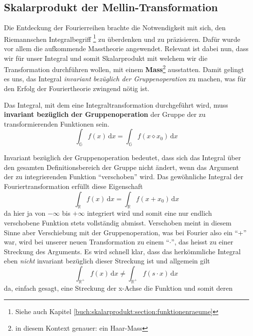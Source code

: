 \subsection{Skalarprodukt der Mellin-Transformation
\label{mellin:subsection:skalarprodukt}}
Die Entdeckung der Fourierreihen brachte die Notwendigkeit mit sich, den 
Riemannschen Integralbegriff \footnote{Siehe auch Kapitel 
\ref{buch:skalarprodukt:section:funktionenraeume}} zu überdenken und zu 
präzisieren.
Dafür wurde vor allem die aufkommende Masstheorie angewendet.
Relevant ist dabei nun, dass wir für unser Integral und somit Skalarprodukt 
mit welchem wir die Transformation durchführen wollen, 
mit einem \textbf{Mass}\footnote{in diesem Kontext genauer: ein Haar-Mass} 
ausstatten. 
Damit gelingt es uns, das Integral 
\emph{invariant bezüglich der Gruppenoperation} zu machen, was für den 
Erfolg der Fouriertheorie zwingend nötig ist. 
\begin{satz}
    \label{buch:papers:mellin:teil2:satz:int}
    Das Integral, mit dem eine Integraltransformation durchgeführt wird, 
    muss \textbf{invariant bezüglich der Gruppenoperation} der Gruppe 
    der zu transformierenden Funktionen sein.
    \[
        \int_\mathbb{G} f(x)\,\mathrm{d}x 
        = \int_\mathbb{G} f(x \diamond x_0)\,\mathrm{d}x
    \]
\end{satz}
Invariant bezüglich der Gruppenoperation bedeutet, dass sich das Integral 
über den gesamten Definitionsbereich der Gruppe nicht ändert, wenn das 
Argument der zu integrierenden Funktion ``verschoben'' wird. 
Das gewöhnliche Integral der Fouriertransformation erfüllt diese 
Eigenschaft 
\begin{equation}
    \int_\mathbb{R} f(x)\,\mathrm{d}x 
    = \int_\mathbb{R} f(x + x_0)\,\mathrm{d}x
\end{equation}
da hier ja von $-\infty$ bis $+\infty$ integriert wird und somit eine nur 
endlich verschobene Funktion stets vollständig abmisst.
Verschoben meint in diesem Sinne aber Verschiebung mit der Gruppenoperation, 
was bei Fourier also ein ``+'' war, wird bei unserer neuen Transformation 
zu einem ``$\cdot$'', das heisst zu einer Streckung des Arguments. 
Es wird schnell klar, dass das herkömmliche Integral eben \emph{nicht} 
invariant bezüglich dieser Streckung ist und allgemein gilt 
\begin{equation}
    \int_\mathbb{R^+} 
    f(x)\,\mathrm{d}x \neq \int_\mathbb{R^+} f(s \cdot x)\,\mathrm{d}x
\end{equation}
da, einfach gesagt, eine Streckung der x-Achse die Funktion und somit deren
